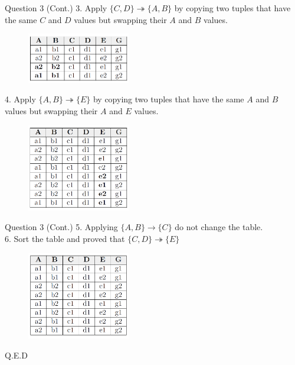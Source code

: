 \begin{frame}[fragile]{Question 3 (Cont.)}
3. Apply $\{C,D\} \twoheadrightarrow \{A,B\}$ by copying two tuples that have the same $C$ and $D$ values but swapping their $A$ and $B$ values.\\
\begin{figure}
	\includegraphics[width=0.4\textwidth, trim=0 0 0 0, clip]{4221-t5/images/3-3.png}
\end{figure}

4. Apply $\{A,B\} \twoheadrightarrow \{E\}$ by copying two tuples that have the same $A$ and $B$ values but swapping their $A$ and $E$ values.\\
\begin{figure}
	\includegraphics[width=0.4\textwidth, trim=0 0 0 0, clip]{4221-t5/images/3-4.png}
\end{figure}
\end{frame}


\begin{frame}[fragile]{Question 3 (Cont.)}
	5. Applying $\{A,B\} \rightarrow \{C\}$ do not change the table.\\\vspace{5pt}
	6. Sort the table and proved that $\{C,D\}\twoheadrightarrow\{E\}$ 
	\begin{figure}
		\includegraphics[width=0.4\textwidth, trim=0 0 0 0, clip]{4221-t5/images/3-6.png}
	\end{figure}

	\hfill Q.E.D
\end{frame}


